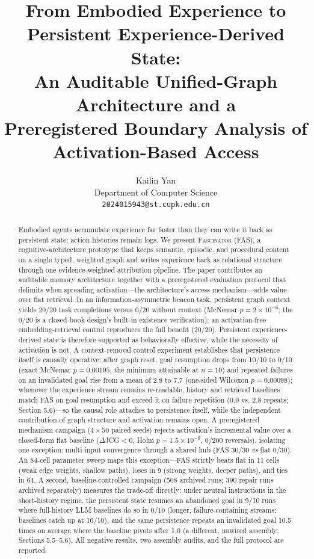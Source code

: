 \documentclass[10pt,a4paper]{article}
\title{\bfseries From Embodied Experience to Persistent Experience-Derived State:\\
An Auditable Unified-Graph Architecture and a\\
Preregistered Boundary Analysis of Activation-Based Access}
\author{Kailin Yan\\ \small Department of Computer Science\\ \small \texttt{2024015943@st.cupk.edu.cn}}
\date{}
\begin{document}
\maketitle

\begin{abstract}
Embodied agents accumulate experience far faster than they can write it back as persistent state: action histories remain logs. We present \textsc{Fascinator} (FAS), a cognitive-architecture prototype that keeps semantic, episodic, and procedural content on a single typed, weighted graph and writes experience back as relational structure through one evidence-weighted attribution pipeline. The paper contributes an auditable memory architecture together with a preregistered evaluation protocol that delimits when spreading activation---the architecture's access mechanism---adds value over flat retrieval. In an information-asymmetric beacon task, persistent graph context yields 20/20 task completions versus 0/20 without context (McNemar $p{=}2\times10^{-6}$; the 0/20 is a closed-book design's built-in existence verification); an activation-free embedding-retrieval control reproduces the full benefit (20/20). Persistent experience-derived state is therefore supported as behaviorally effective, while the necessity of activation is not. A context-removal control experiment establishes that persistence itself is causally operative: after graph reset, goal resumption drops from 10/10 to 0/10 (exact McNemar $p{=}0.00195$, the minimum attainable at $n{=}10$) and repeated failures on an invalidated goal rise from a mean of 2.8 to 7.7 (one-sided Wilcoxon $p{=}0.00098$); whenever the experience stream remains re-readable, history and retrieval baselines match FAS on goal resumption and exceed it on failure repetition (0.0 vs. 2.8 repeats; Section 5.6)---so the causal role attaches to persistence itself, while the independent contribution of graph structure and activation remains open. A preregistered mechanism campaign ($4\times50$ paired seeds) rejects activation's incremental value over a closed-form flat baseline ($\Delta$JCG${<}0$, Holm $p{=}1.5\times10^{-9}$, 0/200 reversals), isolating one exception: multi-input convergence through a shared hub (FAS 30/30 \emph{vs} flat 0/30). An 84-cell parameter sweep maps this exception---FAS strictly beats flat in 11 cells (weak edge weights, shallow paths), loses in 9 (strong weights, deeper paths), and ties in 64. A second, baseline-controlled campaign (508 archived runs; 390 repair runs archived separately) measures the trade-off directly: under neutral instructions in the short-history regime, the persistent state resumes an abandoned goal in 9/10 runs where full-history LLM baselines do so in 0/10 (longer, failure-containing streams: baselines catch up at 10/10), and the same persistence repeats an invalidated goal 10.5 times on average where the baseline pivots after 1.0 (a different, unwired assembly; Sections 5.5--5.6). All negative results, two assembly audits, and the full protocol are reported.
\end{abstract}
\end{document}
